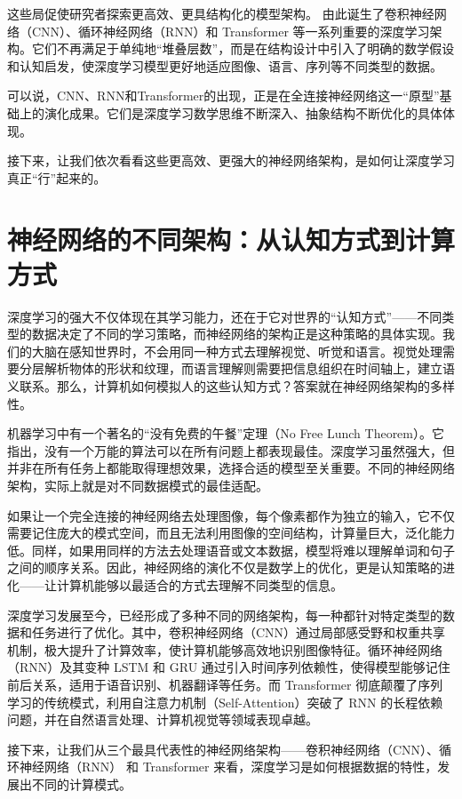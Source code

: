 这些局促使研究者探索更高效、更具结构化的模型架构。 由此诞生了卷积神经网络（CNN）、循环神经网络（RNN）和 Transformer 等一系列重要的深度学习架构。它们不再满足于单纯地“堆叠层数”，而是在结构设计中引入了明确的数学假设和认知启发，使深度学习模型更好地适应图像、语言、序列等不同类型的数据。

可以说，CNN、RNN和Transformer的出现，正是在全连接神经网络这一“原型”基础上的演化成果。它们是深度学习数学思维不断深入、抽象结构不断优化的具体体现。

接下来，让我们依次看看这些更高效、更强大的神经网络架构，是如何让深度学习真正“行”起来的。

\section{神经网络的不同架构：从认知方式到计算方式}

深度学习的强大不仅体现在其学习能力，还在于它对世界的“认知方式”——不同类型的数据决定了不同的学习策略，而神经网络的架构正是这种策略的具体实现。我们的大脑在感知世界时，不会用同一种方式去理解视觉、听觉和语言。视觉处理需要分层解析物体的形状和纹理，而语言理解则需要把信息组织在时间轴上，建立语义联系。那么，计算机如何模拟人的这些认知方式？答案就在神经网络架构的多样性。

机器学习中有一个著名的“没有免费的午餐”定理（No Free Lunch Theorem）。它指出，没有一个万能的算法可以在所有问题上都表现最佳。深度学习虽然强大，但并非在所有任务上都能取得理想效果，选择合适的模型至关重要。不同的神经网络架构，实际上就是对不同数据模式的最佳适配。

如果让一个完全连接的神经网络去处理图像，每个像素都作为独立的输入，它不仅需要记住庞大的模式空间，而且无法利用图像的空间结构，计算量巨大，泛化能力低。同样，如果用同样的方法去处理语音或文本数据，模型将难以理解单词和句子之间的顺序关系。因此，神经网络的演化不仅是数学上的优化，更是认知策略的进化——让计算机能够以最适合的方式去理解不同类型的信息。

深度学习发展至今，已经形成了多种不同的网络架构，每一种都针对特定类型的数据和任务进行了优化。其中，卷积神经网络（CNN）通过局部感受野和权重共享机制，极大提升了计算效率，使计算机能够高效地识别图像特征。循环神经网络（RNN）及其变种 LSTM 和 GRU 通过引入时间序列依赖性，使得模型能够记住前后关系，适用于语音识别、机器翻译等任务。而 Transformer 彻底颠覆了序列学习的传统模式，利用自注意力机制（Self-Attention）突破了 RNN 的长程依赖问题，并在自然语言处理、计算机视觉等领域表现卓越。

接下来，让我们从三个最具代表性的神经网络架构——卷积神经网络（CNN）、循环神经网络（RNN） 和 Transformer 来看，深度学习是如何根据数据的特性，发展出不同的计算模式。

